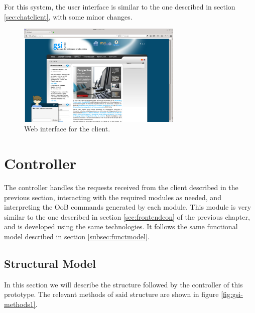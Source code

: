 For this system, the user interface is similar to the one described in section \ref{sec:chatclient}, with some minor changes. 

\begin{figure}[!htbp]
    \centering
    \includegraphics[width=0.7\textwidth]{img/screens/gsi-client.png}
    \caption{Web interface for the client.}
    \label{fig:gsichat1}
\end{figure}

\section{Controller}
\label{sec:controllergsi}

The controller handles the requests received from the client described in the previous section, interacting with the required modules as needed, and interpreting the \ac{OoB} commands generated by each module. This module is very similar to the one described in section \ref{sec:frontendcon} of the previous chapter, and is developed using the same technologies. It follows the same functional model described in section \ref{subsec:functmodel}.

\subsection{Structural Model}

In this section we will describe the structure followed by the controller of this prototype. The relevant methods of said structure are shown in figure \ref{fig:gsi-methods1}.

